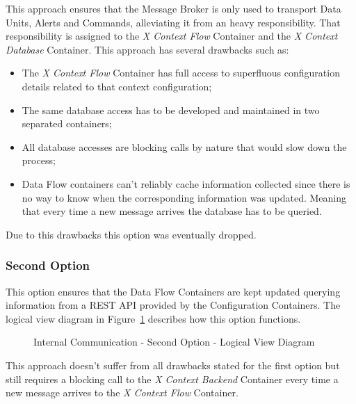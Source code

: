 This approach ensures that the Message Broker is only used to transport Data Units, Alerts and Commands, alleviating it from an heavy responsibility.
That responsibility is assigned to the \textit{X Context Flow} Container and the \textit{X Context Database} Container.
This approach has several drawbacks such as:

\begin{itemize}
   \item The \textit{X Context Flow} Container has full access to superfluous configuration details related to that context configuration;
   \item The same database access has to be developed and maintained in two separated containers;
   \item All database accesses are blocking calls by nature that would slow down the process;
   \item Data Flow containers can't reliably cache information collected since there is no way to know when the corresponding information was updated. Meaning that every time a new message arrives the database has to be queried.
\end{itemize}

Due to this drawbacks this option was eventually dropped.

\subsubsection*{Second Option}
\label{subsubsec:design:alternatives:internal:second}

This option ensures that the Data Flow Containers are kept updated querying information from a \gls{REST} \gls{API} provided by the Configuration Containers. The logical view diagram in Figure~\ref{fig:design:alternatives:internal:second:diagram} describes how this option functions.

\begin{figure}[H]
   \centering
   \resizebox{\columnwidth}{!}
   {
      
   }
   \caption[Internal Communication - Second Option - Logical View Diagram]{Internal Communication - Second Option - Logical View Diagram}
   \label{fig:design:alternatives:internal:second:diagram}
\end{figure}

This approach doesn't suffer from all drawbacks stated for the first option but still requires a blocking call to the \textit{X Context Backend} Container every time a new message arrives to the \textit{X Context Flow} Container.


